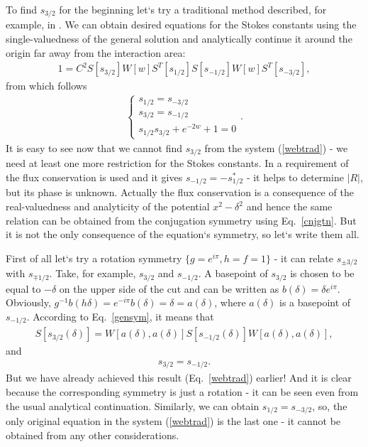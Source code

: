 \documentclass[aps,prl,preprint,superscriptaddress]{revtex4}
\begin{document}
To find $s_{3/2}$ for the beginning let`s try a traditional method described, for example, in \cite{white}. We can obtain desired equations for the Stokes constants using the single-valuedness of the general solution and analytically continue it around the origin far away from the interaction area:
\begin{eqnarray}
1 = C^2S[s_{3/2}]W[w]S^T[s_{1/2}]S[s_{-1/2}]W[w]S^T[s_{-3/2}],
\label{wgac}
\end{eqnarray}
from which follows
\begin{eqnarray}
\begin{cases} 
s_{1/2} = s_{-3/2}\\
s_{3/2} = s_{-1/2}\\ 
s_{1/2}s_{3/2} + e^{-2w} + 1 = 0
\end{cases}.
\label{webtrad}  
\end{eqnarray}
It is easy to see now that we cannot find $s_{3/2}$ from the system (\ref{webtrad}) - we need at least one more restriction for the Stokes constants. In \cite{white} a requirement of the flux conservation is used and it gives $s_{-1/2}=-s_{1/2}^*$ - it helps to determine $|R|$, but its phase is unknown. Actually the flux conservation is a consequence of the real-valuedness and analyticity of the potential $x^2-\delta^2$ and hence the same relation can be obtained from the conjugation symmetry using Eq.~\ref{cnjgtn}. But it is not the only consequence of the equation`s symmetry, so let`s write them all.

First of all let`s try a rotation symmetry $\{g=e^{i\pi},h=f=1\}$ - it can relate $s_{\pm 3/2}$ with $s_{\mp 1/2}$. Take, for example, $s_{3/2}$ and $s_{-1/2}$. A basepoint of $s_{3/2}$ is chosen to be equal to $-\delta$ on the upper side of the cut and can be written as $b(\delta)=\delta e^{i\pi}$. Obviously, $g^{-1}b(h\delta)=e^{-i\pi}b(\delta)=\delta=a(\delta)$, where $a(\delta)$ is a basepoint of $s_{-1/2}$. According to Eq.~\ref{gensym}, it means that
\begin{eqnarray}
S[s_{3/2}(\delta)] = W[a(\delta),a(\delta)]S[s_{-1/2}(\delta)]W[a(\delta),a(\delta)],
\label{webrs1}
\end{eqnarray}
and
\begin{eqnarray}
s_{3/2} = s_{-1/2}.
\label{webrel1}
\end{eqnarray}
But we have already achieved this result (Eq.~\ref{webtrad}) earlier! And it is clear because the corresponding symmetry is just a rotation - it can be seen even from the usual analytical continuation. Similarly, we can obtain $s_{1/2}=s_{-3/2}$, so, the only original equation in the system (\ref{webtrad}) is the last one - it cannot be obtained from any other considerations.
\end{document}
